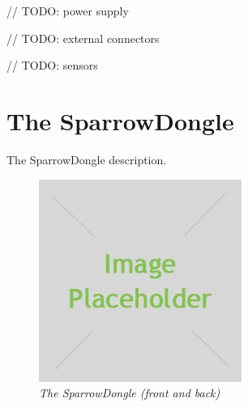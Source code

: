 \color{red}
// TODO: power supply

// TODO: external connectors

// TODO: sensors
\color{black}

\section{The SparrowDongle}

The SparrowDongle description.

\begin{figure}[ht]
	\begin{center}
		\includegraphics{img/placeholder.jpg}
	\end{center}
	\caption{\small \itshape{The SparrowDongle (front and back)}}
\end{figure}

